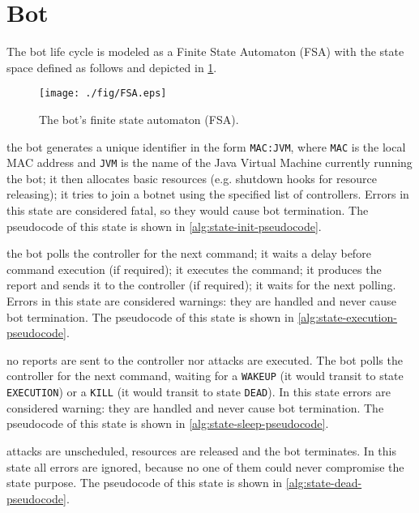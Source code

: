 \section{Bot}
\label{sec:bot}

The bot life cycle is modeled as a Finite State Automaton (FSA) with the state space defined as follows and depicted in \ref{fig:bot-fsa}.

\begin{figure}[tp]
  \centering
  \texttt{[image: ./fig/FSA.eps]}
  \caption{The bot's finite state automaton (FSA).}
    \label{fig:bot-fsa}
\end{figure}

\begin{description}
  \setlength\itemsep{1em}

  \item[INIT] the bot generates a unique identifier in the form \texttt{MAC:JVM}, where \texttt{MAC} is the local MAC address and \texttt{JVM} is the name of the Java Virtual Machine currently running the bot; it then allocates basic resources (e.g. shutdown hooks for resource releasing); it tries to join a botnet using the specified list of controllers.
  Errors in this state are considered fatal, so they would cause bot termination. The pseudocode of this state is shown in \ref{alg:state-init-pseudocode}.

  \item[EXECUTION] the bot polls the controller for the next command; it waits a delay before command execution (if required); it executes the command; it produces the report and sends it to the controller (if required); it waits for the next polling.
  Errors in this state are considered warnings: they are handled and never cause bot termination. The pseudocode of this state is shown in \ref{alg:state-execution-pseudocode}.

  \item[SLEEP] no reports are sent to the controller nor attacks are executed. The bot polls the controller for the next command, waiting for a \texttt{WAKEUP} (it would transit to state \texttt{EXECUTION}) or a \texttt{KILL} (it would transit to state \texttt{DEAD}).
  In this state errors are considered warning: they are handled and never cause bot termination. The pseudocode of this state is shown in \ref{alg:state-sleep-pseudocode}.

  \item[DEAD] attacks are unscheduled, resources are released and the bot terminates. In this state all errors are ignored, because no one of them could never compromise the state purpose. The pseudocode of this state is shown in \ref{alg:state-dead-pseudocode}.

\end{description}

